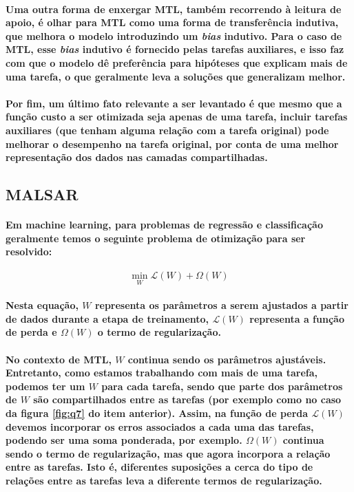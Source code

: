 \documentclass[a4paper]{article}    %
\begin{document}
\paragraph{Uma outra forma de enxergar MTL, também recorrendo à leitura de apoio, é olhar para MTL como uma forma de transferência indutiva, que melhora o modelo introduzindo um \emph{bias} indutivo. Para o caso de MTL, esse \emph{bias} indutivo é fornecido pelas tarefas auxiliares, e isso faz com que o modelo dê preferência para hipóteses que explicam mais de uma tarefa, o que geralmente leva a soluções que generalizam melhor.}

\paragraph{Por fim, um último fato relevante a ser levantado é que mesmo que a função custo a ser otimizada seja apenas de uma tarefa, incluir tarefas auxiliares (que tenham alguma relação com a tarefa original) pode melhorar o desempenho na tarefa original, por conta de uma melhor representação dos dados nas camadas compartilhadas.}

\subsection{MALSAR}
\paragraph{Em machine learning, para problemas de regressão e classificação geralmente temos o seguinte problema de otimização para ser resolvido:}

\[\min_W \mathcal{L}(W) + \Omega(W)\]

\paragraph{Nesta equação, $W$ representa os parâmetros a serem ajustados a partir de dados durante a etapa de treinamento, $\mathcal{L}(W)$ representa a função de perda e $\Omega(W)$ o termo de regularização.}

\paragraph{No contexto de MTL, $W$ continua sendo os parâmetros ajustáveis. Entretanto, como estamos trabalhando com mais de uma tarefa, podemos ter um $W$ para cada tarefa, sendo que parte dos parâmetros de $W$ são compartilhados entre as tarefas (por exemplo como no caso da figura \ref{fig:q7} do item anterior). Assim, na função de perda $\mathcal{L}(W)$ devemos incorporar os erros associados a cada uma das tarefas, podendo ser uma soma ponderada, por exemplo. $\Omega(W)$ continua sendo o termo de regularização, mas que agora incorpora a relação entre as tarefas. Isto é, diferentes suposições a cerca do tipo de relações entre as tarefas leva a diferente termos de regularização.}
\end{document}
